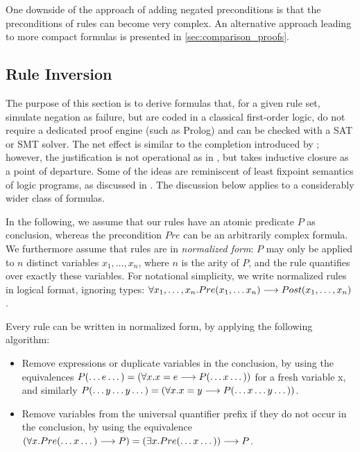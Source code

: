One downside of the approach of adding negated preconditions is that the
preconditions of rules can become very complex. An alternative approach
leading to more compact formulas is presented in \ref{sec:comparison_proofs}.


\subsection{Rule Inversion}\label{sec:rule_inversion}

The purpose of this section is to derive formulas that, for a given rule set,
simulate negation as failure, but are coded in a classical first-order logic,
do not require a dedicated proof engine (such as Prolog) and can be checked
with a SAT or SMT solver. The net effect is similar to the completion
introduced by \cite{clark_NegAsFailure_1978}; however, the justification
is not operational as in \cite{clark_NegAsFailure_1978}, but takes inductive
closure as a point of departure. Some of the ideas are reminiscent of least
fixpoint semantics of logic programs, as discussed in
\cite{falaschi_etal_declarative_logic_langauges_1989,fages_consistency_clark_completion_1994}.
The discussion below applies to a considerably wider class of formulas.

In the following, we assume that our rules have an atomic predicate $P$ as
conclusion, whereas the precondition $Pre$ can be an arbitrarily complex
formula.  We furthermore assume that rules are in \emph{normalized form}: $P$
may only be applied to $n$ distinct variables $x_1, \dots, x_n$, where $n$ is
the arity of $P$, and the rule quantifies over exactly these variables.
For notational simplicity, we write normalized rules in logical format,
ignoring types:
$\forall x_1, \dots, x_n. Pre(x_1, \dots x_n) \longrightarrow Post(x_1, \dots, x_n)$.

Every rule can be written in normalized form, by applying the following
algorithm:
\begin{itemize}
\item Remove expressions or duplicate variables in the conclusion, by using
  the equivalences $P(\dots e \dots) = (\forall x. x = e \longrightarrow P(\dots x
  \dots))$ for a fresh variable x, and similarly $P(\dots y \dots y \dots) =
  (\forall x. x = y   \longrightarrow P(\dots x \dots y \dots))$.
\item Remove variables from the universal quantifier prefix if they do not
  occur in the conclusion, by using the equivalence
  $(\forall x. Pre(\dots x \dots) \longrightarrow P) = (\exists x. Pre(\dots x \dots))
  \longrightarrow P$.
\end{itemize}

